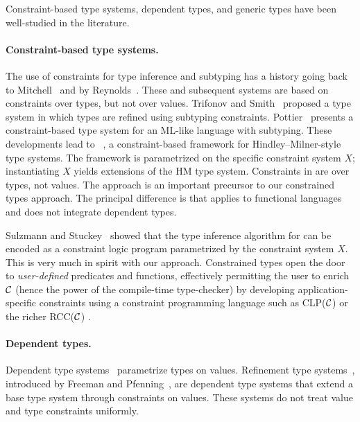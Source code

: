 Constraint-based type systems, dependent types, and generic types
have been well-studied in the literature.

\paragraph{Constraint-based type systems.}

The use of constraints for type inference and subtyping has a history
going back to Mitchell~\cite{mitchell84} and by
Reynolds~\cite{reynolds85}.  These and subsequent systems are based on
constraints over types, but not over values.  Trifonov and
Smith~\cite{trifonov96} proposed a type system in which types are
refined using subtyping constraints.
Pottier~\cite{pottier96simplifying} presents a constraint-based type
system for an ML-like language with subtyping.  These developments
lead to \hmx~\cite{sulzmann97type}, a constraint-based framework for
Hindley--Milner-style type systems.  The framework is parametrized on
the specific constraint system $X$; instantiating $X$ yields
extensions of the HM type system.  Constraints in \hmx{} are over
types, not values. The \hmx{} approach is an important precursor to
our constrained types approach. The principal difference is that
\hmx{} applies to functional languages and does not integrate
dependent types.

%
Sulzmann and Stuckey~\cite{sulzmann-hmx-clpx} showed that the
type inference algorithm for \hmx can be encoded as a
constraint logic program parametrized by the constraint system
$X$. This is very much in spirit with our approach.
Constrained types open the door to {\em user-defined}
predicates and functions, effectively permitting the user to enrich
$\cal C$ (hence the power of the compile-time type-checker) by
developing application-specific constraints using a constraint
programming language such as CLP($\cal C$) \cite{clp} or the richer
RCC($\cal C$) \cite{DBLP:conf/fsttcs/JagadeesanNS05}.

\paragraph{Dependent types.}

Dependent type
systems~\cite{xi99dependent,calc-constructions,epigram,cayenne}
parametrize types on values.  Refinement type
systems~\cite{refinement-types,conditional-types,jones94,sized-types,flanagan-popl06,flanagan-fool06,liquid-types},
introduced by Freeman and Pfenning~\cite{refinement-types}, are dependent type
systems that extend a base type system through constraints on values.  These
systems do not treat value and type constraints uniformly.

